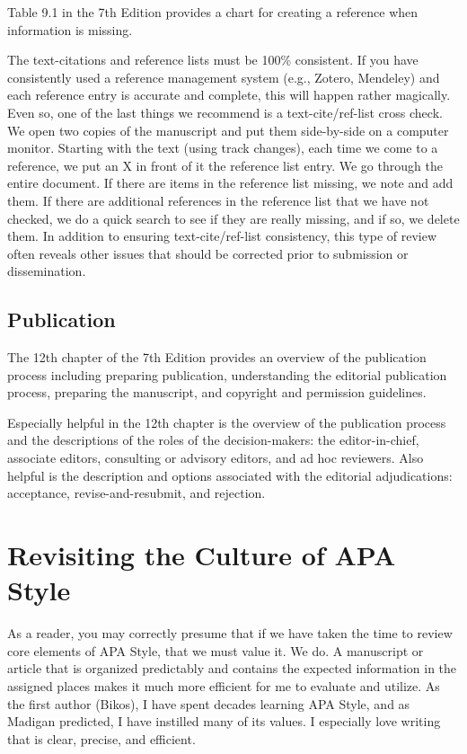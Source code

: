 \documentclass[
  11pt,
]{book}
\begin{document}
Table 9.1 in the 7th Edition provides a chart for creating a reference when information is missing.

The text-citations and reference lists must be 100\% consistent. If you have consistently used a reference management system (e.g., Zotero, Mendeley) and each reference entry is accurate and complete, this will happen rather magically. Even so, one of the last things we recommend is a text-cite/ref-list cross check. We open two copies of the manuscript and put them side-by-side on a computer monitor. Starting with the text (using track changes), each time we come to a reference, we put an X in front of it the reference list entry. We go through the entire document. If there are items in the reference list missing, we note and add them. If there are additional references in the reference list that we have not checked, we do a quick search to see if they are really missing, and if so, we delete them. In addition to ensuring text-cite/ref-list consistency, this type of review often reveals other issues that should be corrected prior to submission or dissemination.

\hypertarget{publication}{%
\subsection{Publication}\label{publication}}

The 12th chapter of the 7th Edition provides an overview of the publication process including preparing publication, understanding the editorial publication process, preparing the manuscript, and copyright and permission guidelines.

Especially helpful in the 12th chapter is the overview of the publication process and the descriptions of the roles of the decision-makers: the editor-in-chief, associate editors, consulting or advisory editors, and ad hoc reviewers. Also helpful is the description and options associated with the editorial adjudications: acceptance, revise-and-resubmit, and rejection.

\hypertarget{revisiting-the-culture-of-apa-style}{%
\section{Revisiting the Culture of APA Style}\label{revisiting-the-culture-of-apa-style}}

As a reader, you may correctly presume that if we have taken the time to review core elements of APA Style, that we must value it. We do. A manuscript or article that is organized predictably and contains the expected information in the assigned places makes it much more efficient for me to evaluate and utilize. As the first author (Bikos), I have spent decades learning APA Style, and as Madigan \citeyearpar{madigan_language_1995} predicted, I have instilled many of its values. I especially love writing that is clear, precise, and efficient.
\end{document}
